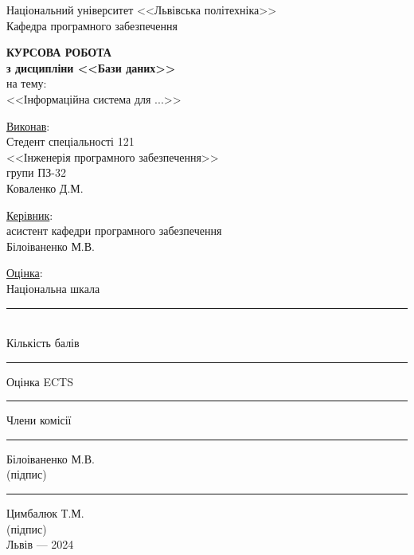 \documentclass[oneside,14pt]{extarticle}
\begin{document}
\begin{titlepage}
	\begin{center}
		Національний університет <<Львівська політехніка>>\\
		Кафедра програмного забезпечення
		
		\vspace{40pt}
		\textbf{\LARGE КУРСОВА РОБОТА}\\
		{\large
		\textbf{з дисципліни <<Бази даних>>}\\
		на тему:\\
		<<Інформаційна система для ...>>
		}
		\vspace*{40pt}
		
		\begin{flushright}
		    \begin{minipage}{0.6\textwidth}
		        \underline{Виконав}:\\
                Стедент спеціальності 121\\
			    <<Інженерія програмного забезпечення>>\\
			    групи ПЗ-32\\
			    Коваленко Д.М.
			    \bigbreak
			    
			    \underline{Керівник}:\\
			    асистент кафедри програмного забезпечення\\
			    Білоіваненко М.В.
			    \bigbreak
			    
			    \underline{Оцінка}:\\
			    Національна шкала \rule{6.35cm}{0.15mm}\\			
			    Кількість балів \rule{2cm}{0.15mm} Оцінка ECTS \rule{2cm}{0.15mm}
			    \bigbreak
            \end{minipage}
		\end{flushright}
		\vspace{40pt}
		Члени комісії \hspace{1.9cm} \rule{3cm}{0.15mm} \hspace{1cm} Білоіваненко М.В.\\
		{\small\vspace{-5pt}(підпис)}\\
		\hspace{2.65cm}\hspace{1.9cm}  \rule{3cm}{0.15mm} \hspace{1cm} Цимбалюк Т.М.\\
		{\small\vspace{-5pt}(підпис)}\\
		
		\vspace{\fill}
		Львів — 2024
	\end{center}
\end{titlepage}
\setcounter{page}{2}
\tableofcontents
\newpage
\end{document}
